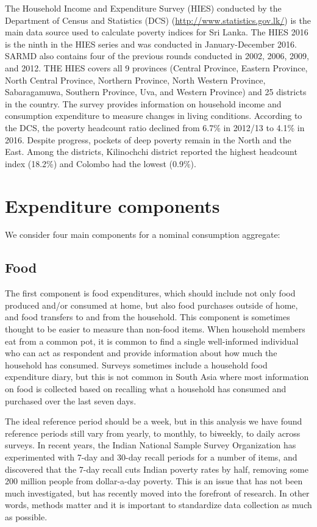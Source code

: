 \documentclass[13 pt,]{book}
\begin{document}
The Household Income and Expenditure Survey (HIES) conducted by the
Department of Census and Statistics (DCS)
(\url{http://www.statistics.gov.lk/}) is the main data source used to
calculate poverty indices for Sri Lanka. The HIES 2016 is the ninth in
the HIES series and was conducted in January-December 2016. SARMD also
contains four of the previous rounds conducted in 2002, 2006, 2009, and
2012. THE HIES covers all 9 provinces (Central Province, Eastern
Province, North Central Province, Northern Province, North Western
Province, Sabaragamuwa, Southern Province, Uva, and Western Province)
and 25 districts in the country. The survey provides information on
household income and consumption expenditure to measure changes in
living conditions. According to the DCS, the poverty headcount ratio
declined from 6.7\% in 2012/13 to 4.1\% in 2016. Despite progress,
pockets of deep poverty remain in the North and the East. Among the
districts, Kilinochchi district reported the highest headcount index
(18.2\%) and Colombo had the lowest (0.9\%).

\section{Expenditure components}\label{expenditure-components}

We consider four main components for a nominal consumption aggregate:

\subsection{Food}\label{food}

The first component is food expenditures, which should include not only
food produced and/or consumed at home, but also food purchases outside
of home, and food transfers to and from the household. This component is
sometimes thought to be easier to measure than non-food items. When
household members eat from a common pot, it is common to find a single
well-informed individual who can act as respondent and provide
information about how much the household has consumed. Surveys sometimes
include a household food expenditure diary, but this is not common in
South Asia where most information on food is collected based on
recalling what a household has consumed and purchased over the last
seven days.

The ideal reference period should be a week, but in this analysis we
have found reference periods still vary from yearly, to monthly, to
biweekly, to daily across surveys. In recent years, the Indian National
Sample Survey Organization has experimented with 7-day and 30-day recall
periods for a number of items, and discovered that the 7-day recall cuts
Indian poverty rates by half, removing some 200 million people from
dollar-a-day poverty. This is an issue that has not been much
investigated, but has recently moved into the forefront of research. In
other words, methods matter and it is important to standardize data
collection as much as possible.
\end{document}
